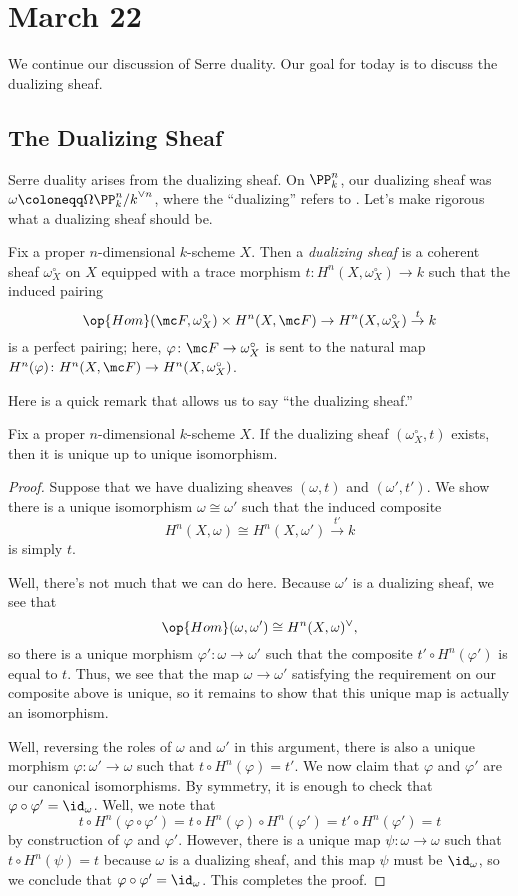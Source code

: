 \documentclass[../notes.tex]{subfiles}
\begin{document}
\section{March 22}

We continue our discussion of Serre duality. Our goal for today is to discuss the dualizing sheaf.

\subsection{The Dualizing Sheaf}
Serre duality arises from the dualizing sheaf. On $\PP^n_k$, our dualizing sheaf was $\omega\coloneqq\Omega{\PP^n_k/k}^{\lor n}$, where the ``dualizing'' refers to . Let's make rigorous what a dualizing sheaf should be.
\begin{definition}
	Fix a proper $n$-dimensional $k$-scheme $X$. Then a \textit{dualizing sheaf} is a coherent sheaf $\omega^\circ_X$ on $X$ equipped with a trace morphism $t\colon H^n(X,\omega^\circ_X)\to k$ such that the induced pairing
	\[\op{Hom}(\mc F,\omega^\circ_X)\times H^n(X,\mc F)\to H^n(X,\omega_X^\circ)\stackrel t\to k\]
	is a perfect pairing; here, $\varphi\colon\mc F\to\omega_X^\circ$ is sent to the natural map $H^n(\varphi)\colon H^n(X,\mc F)\to H^n(X,\omega_X^\circ)$.
\end{definition}
Here is a quick remark that allows us to say ``the dualizing sheaf.''
\begin{proposition}
	Fix a proper $n$-dimensional $k$-scheme $X$. If the dualizing sheaf $(\omega^\circ_X,t)$ exists, then it is unique up to unique isomorphism.
\end{proposition}
\begin{proof}
	Suppose that we have dualizing sheaves $(\omega,t)$ and $(\omega',t')$. We show there is a unique isomorphism $\omega\cong\omega'$ such that the induced composite
	\[H^n(X,\omega)\cong H^n(X,\omega')\stackrel{t'}\to k\]
	is simply $t$.
	
	Well, there's not much that we can do here. Because $\omega'$ is a dualizing sheaf, we see that
	\[\op{Hom}(\omega,\omega')\cong H^n(X,\omega)^\lor,\]
	so there is a unique morphism $\varphi'\colon\omega\to\omega'$ such that the composite $t'\circ H^n(\varphi')$ is equal to $t$. Thus, we see that the map $\omega\to\omega'$ satisfying the requirement on our composite above is unique, so it remains to show that this unique map is actually an isomorphism.
	
	Well, reversing the roles of $\omega$ and $\omega'$ in this argument, there is also a unique morphism $\varphi\colon\omega'\to\omega$ such that $t\circ H^n(\varphi)=t'$. We now claim that $\varphi$ and $\varphi'$ are our canonical isomorphisms. By symmetry, it is enough to check that $\varphi\circ\varphi'=\id_\omega$. Well, we note that
	\[t\circ H^n(\varphi\circ\varphi')=t\circ H^n(\varphi)\circ H^n(\varphi')=t'\circ H^n(\varphi')=t\]
	by construction of $\varphi$ and $\varphi'$. However, there is a unique map $\psi\colon\omega\to\omega$ such that $t\circ H^n(\psi)=t$ because $\omega$ is a dualizing sheaf, and this map $\psi$ must be $\id_\omega$, so we conclude that $\varphi\circ\varphi'=\id_\omega$. This completes the proof.
\end{proof}
\end{document}
